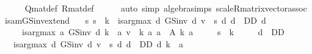 \begin{isabellebody}
\ \ \ \ \isamarkupfalse%
\ Q{\isacharunderscore}{\kern0pt}mat{\isacharunderscore}{\kern0pt}def\ R{\isacharunderscore}{\kern0pt}mat{\isacharunderscore}{\kern0pt}def\isanewline
\ \ \ \ \isamarkupfalse%
\ {\isacharparenleft}{\kern0pt}auto\ simp{\isacharcolon}{\kern0pt}\ algebra{\isacharunderscore}{\kern0pt}simps\ scaleR{\isacharunderscore}{\kern0pt}matrix{\isacharunderscore}{\kern0pt}vector{\isacharunderscore}{\kern0pt}assoc{\isacharparenright}{\kern0pt}\isanewline
{}\isamarkupfalse%
%
\endisatagproof
{\isafoldproof}%
%
\isadelimproof
\isanewline
%
\endisadelimproof
\isanewline
{}\isamarkupfalse%
\ is{\isacharunderscore}{\kern0pt}am{\isacharunderscore}{\kern0pt}GS{\isacharunderscore}{\kern0pt}inv{\isacharunderscore}{\kern0pt}extend{\isacharcolon}{\kern0pt}\isanewline
\ \ \ {\isachardoublequoteopen}{\isasymAnd}s{\isachardot}{\kern0pt}\ s\ {\isacharless}{\kern0pt}\ k\ {\isasymLongrightarrow}\ is{\isacharunderscore}{\kern0pt}arg{\isacharunderscore}{\kern0pt}max\ {\isacharparenleft}{\kern0pt}{\isasymlambda}d{\isachardot}{\kern0pt}\ GS{\isacharunderscore}{\kern0pt}inv\ d\ v\ {\isachardollar}{\kern0pt}\ s{\isacharparenright}{\kern0pt}\ {\isacharparenleft}{\kern0pt}{\isasymlambda}d{\isachardot}{\kern0pt}\ d\ {\isasymin}\ D\isactrlsub D{\isacharparenright}{\kern0pt}\ d{\isachardoublequoteclose}\isanewline
\ \ \ \ \ {\isachardoublequoteopen}is{\isacharunderscore}{\kern0pt}arg{\isacharunderscore}{\kern0pt}max\ {\isacharparenleft}{\kern0pt}{\isasymlambda}a{\isachardot}{\kern0pt}\ GS{\isacharunderscore}{\kern0pt}inv\ {\isacharparenleft}{\kern0pt}d\ {\isacharparenleft}{\kern0pt}k\ {\isacharcolon}{\kern0pt}{\isacharequal}{\kern0pt}\ a{\isacharparenright}{\kern0pt}{\isacharparenright}{\kern0pt}\ v\ {\isachardollar}{\kern0pt}\ k{\isacharparenright}{\kern0pt}\ {\isacharparenleft}{\kern0pt}{\isasymlambda}a{\isachardot}{\kern0pt}\ a\ {\isasymin}\ A\ k{\isacharparenright}{\kern0pt}\ a{\isachardoublequoteclose}\isanewline
\ \ \ \ \ {\isachardoublequoteopen}s\ {\isasymle}\ k{\isachardoublequoteclose}\isanewline
\ \ \ \ \ {\isachardoublequoteopen}d\ {\isasymin}\ D\isactrlsub D{\isachardoublequoteclose}\isanewline
\ \ \ {\isachardoublequoteopen}is{\isacharunderscore}{\kern0pt}arg{\isacharunderscore}{\kern0pt}max\ {\isacharparenleft}{\kern0pt}{\isasymlambda}d{\isachardot}{\kern0pt}\ GS{\isacharunderscore}{\kern0pt}inv\ d\ v\ {\isachardollar}{\kern0pt}\ s{\isacharparenright}{\kern0pt}\ {\isacharparenleft}{\kern0pt}{\isasymlambda}d{\isachardot}{\kern0pt}\ d\ {\isasymin}\ D\isactrlsub D{\isacharparenright}{\kern0pt}\ {\isacharparenleft}{\kern0pt}d\ {\isacharparenleft}{\kern0pt}k\ {\isacharcolon}{\kern0pt}{\isacharequal}{\kern0pt}\ a{\isacharparenright}{\kern0pt}{\isacharparenright}{\kern0pt}{\isachardoublequoteclose}\isanewline

\end{isabellebody}

